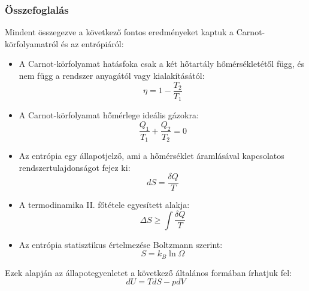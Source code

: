 \documentclass[a4paper,12pt]{article}
\begin{document}
\subsubsection*{Összefoglalás}
Mindent összegezve a következő fontos eredményeket kaptuk a Carnot-körfolyamatról és az entrópiáról:
\begin{itemize}
    \item A Carnot-körfolyamat hatásfoka csak a két hőtartály hőmérsékletétől függ, és nem függ a rendszer anyagától vagy kialakításától:
    \begin{equation}
        \eta = 1 - \frac{T_2}{T_1}
    \end{equation}
    \item A Carnot-körfolyamat hőmérlege ideális gázokra:
    \begin{equation}
        \frac{Q_1}{T_1} + \frac{Q_2}{T_2} = 0
    \end{equation}
    \item Az entrópia egy állapotjelző, ami a hőmérséklet áramlásával kapcsolatos rendszertulajdonságot fejez ki:
    \begin{equation}
        dS = \frac{\delta Q}{T}
    \end{equation}
    \item A termodinamika II. főtétele egyesített alakja:
    \begin{equation}
        \Delta S \geq \int \frac{\delta Q}{T}
    \end{equation}
    \item Az entrópia statisztikus értelmezése Boltzmann szerint:
    \begin{equation}
        S = k_B \ln{\Omega}
    \end{equation}
\end{itemize}

Ezek alapján az állapotegyenletet a következő általános formában írhatjuk fel:
\begin{equation}
    \boxed{dU = T dS - p dV}
\end{equation}
\end{document}
